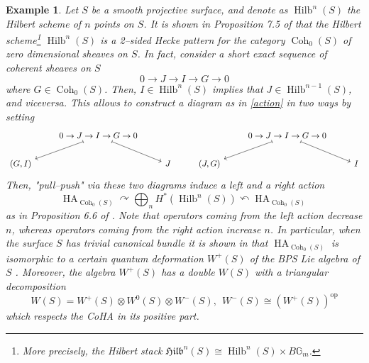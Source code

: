 \documentclass[11pt]{article}
\newtheorem{example}{Example}
\begin{document}
\begin{example}\label{ex : hilbS}
    Let $S$ be a smooth projective surface, and denote as $\operatorname{Hilb}^n(S)$ the Hilbert scheme of $n$ points on $S$. It is shown in Proposition 7.5 of \cite{mmsv23} that the Hilbert scheme\footnote{More precisely, the Hilbert stack $\mathfrak{Hilb}^n(S) \cong \operatorname{Hilb}^n(S) \times B\mathbb{G}_m$.} $\operatorname{Hilb}^n(S)$ is a 2--sided Hecke pattern for the category $\operatorname{Coh}_0(S)$ of zero dimensional sheaves on $S$. In fact, consider a short exact sequence of coherent sheaves on $S$
    \[
        0 \rightarrow J \rightarrow I \rightarrow G \rightarrow 0
    \]
    where $G \in \operatorname{Coh}_0(S)$. Then, $I \in \operatorname{Hilb}^n(S)$ implies that $J \in \operatorname{Hilb}^{n-1}(S)$, and viceversa. This allows to construct a diagram as in \eqref{action} in two ways by setting
   \[\begin{tikzcd}
	& {0 \rightarrow J \rightarrow I \rightarrow G \rightarrow 0} &&& { 0 \rightarrow J \rightarrow I \rightarrow G \rightarrow 0} & \\
	{(G,I)} && {J} & {(J,G)} && I
	\arrow[maps to, from=1-2, to=2-1]
	\arrow[maps to, from=1-2, to=2-3]
	\arrow[maps to, from=1-5, to=2-4]
	\arrow[maps to, from=1-5, to=2-6]
\end{tikzcd}\]
    Then, "pull--push" via these two diagrams induce a left and a right action
    \[
       \operatorname{HA}_{\operatorname{Coh}_0(S)} \curvearrowright  \bigoplus_n {H}^*(\operatorname{Hilb}^n(S))\curvearrowleft  \operatorname{HA}_{\operatorname{Coh}_0(S)} 
    \]
    as in Proposition 6.6 of \cite{mmsv23}. Note that operators coming from the left action decrease $n$, whereas operators coming from the right action increase $n$. In particular, when the surface $S$ has trivial canonical bundle it is shown in \cite{mmsv23} that $\operatorname{HA}_{\operatorname{Coh}_0(S)}$ is isomorphic to a certain quantum deformation $W^+(S)$ of the BPS Lie algebra of $S$ \cite{dhm}. Moreover, the algebra $W^+(S)$ has a \textit{double} $W(S)$ with a triangular decomposition
$$
W(S) = W^+(S) \otimes W^0(S) \otimes W^-(S) , \ \ W^-(S) \cong (W^+(S))^\text{op} 
$$
which respects the \textit{CoHA} in its positive part. 
\end{example}
\end{document}
